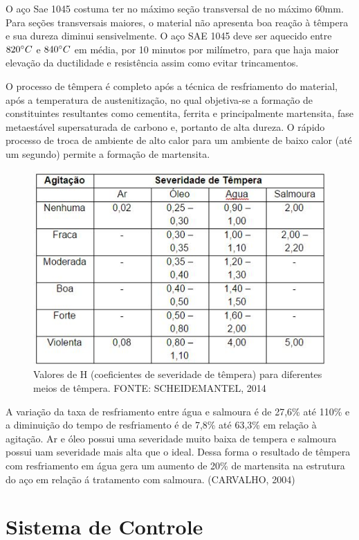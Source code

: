 O aço Sae 1045 costuma ter no máximo seção transversal de no máximo 60mm. Para seções transversais maiores, o material não apresenta boa reação à têmpera e sua dureza diminui sensivelmente. O aço SAE 1045 deve ser aquecido entre $820 \degree C$ e $840 \degree C$ em média, por 10 minutos por milímetro, para que haja maior elevação da ductilidade e resistência assim como evitar trincamentos.

O processo de têmpera é completo após a técnica de resfriamento do material, após a temperatura de austenitização, no qual objetiva-se a formação de constituintes resultantes como cementita, ferrita e principalmente martensita, fase metaestável supersaturada de carbono e, portanto de alta dureza. O rápido processo de troca de ambiente de alto calor para um ambiente de baixo calor (até um segundo) permite a formação de martensita.

\begin{figure}[!h]
	\centering
	\label{tab_valoresH}
	\includegraphics[keepaspectratio=true,scale=0.8]{figuras/tab_valoresH.JPG}
	\caption{Valores de H (coeficientes de severidade de têmpera) para diferentes meios de têmpera. FONTE: SCHEIDEMANTEL, 2014}
\end{figure}

A variação da taxa de resfriamento entre água e salmoura é de 27,6\% até 110\% e a diminuição do tempo de resfriamento é de 7,8\% até 63,3\% em relação à agitação. Ar e óleo possui uma severidade muito baixa de tempera e salmoura possui uam severidade mais alta que o ideal. Dessa forma o resultado de têmpera com resfriamento em água gera um aumento de 20\% de martensita na estrutura do aço em relação á tratamento com salmoura. (CARVALHO, 2004)

\section{Sistema de Controle}

